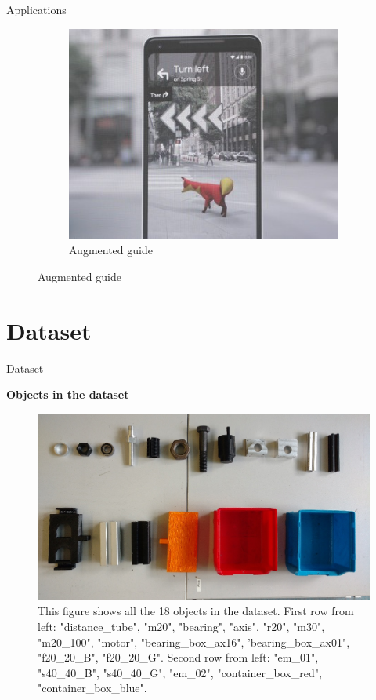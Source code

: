 \documentclass{beamer}
\begin{document}
\begin{frame}{Applications}
\begin{figure}
\begin{subfigure}{0.3\textwidth}
			\centering
			\includegraphics[width=0.8\linewidth]{images/vr_dog}
			\caption{Augmented guide}
		\end{subfigure}
		\label{Fig:app}
	\end{figure}

\end{frame}

\section{Dataset}

\begin{frame}{Dataset}
	
	\textbf{Objects in the dataset}
	\begin{figure}[h]
		\centering
		\includegraphics[scale=0.2]{images/all_objects}
		\caption{This figure shows all the 18 objects in the dataset. First row from left: "distance\_tube", "m20", "bearing", "axis", "r20", "m30", "m20\_100", "motor", "bearing\_box\_ax16", 'bearing\_box\_ax01", "f20\_20\_B", "f20\_20\_G". Second row from left: "em\_01", "s40\_40\_B", "s40\_40\_G", "em\_02", "container\_box\_red", "container\_box\_blue".}
		\label{Fig:allobjects}
	\end{figure}

\end{frame}
\end{document}
